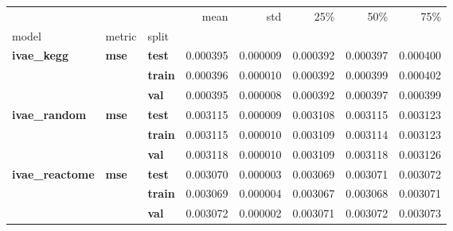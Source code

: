\begin{tabular}{lllrrrrr}
\toprule
 &  &  & mean & std & 25\% & 50\% & 75\% \\
model & metric & split &  &  &  &  &  \\
\midrule
\multirow[t]{3}{*}{\textbf{ivae\_kegg}} & \multirow[t]{3}{*}{\textbf{mse}} & \textbf{test} & 0.000395 & 0.000009 & 0.000392 & 0.000397 & 0.000400 \\
\textbf{} & \textbf{} & \textbf{train} & 0.000396 & 0.000010 & 0.000392 & 0.000399 & 0.000402 \\
\textbf{} & \textbf{} & \textbf{val} & 0.000395 & 0.000008 & 0.000392 & 0.000397 & 0.000399 \\
\cline{1-8} \cline{2-8}
\multirow[t]{3}{*}{\textbf{ivae\_random}} & \multirow[t]{3}{*}{\textbf{mse}} & \textbf{test} & 0.003115 & 0.000009 & 0.003108 & 0.003115 & 0.003123 \\
\textbf{} & \textbf{} & \textbf{train} & 0.003115 & 0.000010 & 0.003109 & 0.003114 & 0.003123 \\
\textbf{} & \textbf{} & \textbf{val} & 0.003118 & 0.000010 & 0.003109 & 0.003118 & 0.003126 \\
\cline{1-8} \cline{2-8}
\multirow[t]{3}{*}{\textbf{ivae\_reactome}} & \multirow[t]{3}{*}{\textbf{mse}} & \textbf{test} & 0.003070 & 0.000003 & 0.003069 & 0.003071 & 0.003072 \\
\textbf{} & \textbf{} & \textbf{train} & 0.003069 & 0.000004 & 0.003067 & 0.003068 & 0.003071 \\
\textbf{} & \textbf{} & \textbf{val} & 0.003072 & 0.000002 & 0.003071 & 0.003072 & 0.003073 \\
\cline{1-8} \cline{2-8}
\bottomrule
\end{tabular}
